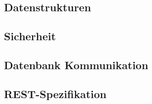 \subsection{Datenstrukturen}
\subsection{Sicherheit}
\subsection{Datenbank Kommunikation}
\subsection{REST-Spezifikation}